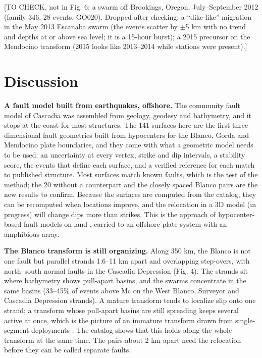 \documentclass[11pt]{article}
\begin{document}
{[}TO CHECK, not in Fig. 6: a swarm off Brookings, Oregon,
July--September 2012 (family 346, 28 events, GO020). Dropped after
checking: a ``dike-like'' migration in the May 2013 Escanaba swarm (the
events scatter by \ensuremath{\pm}5 km with no trend and depths at or above sea level;
it is a 15-hour burst); a 2015 precursor on the Mendocino transform
(2015 looks like 2013--2014 while stations were present).{]}

\section{Discussion}\label{discussion}

\textbf{A fault model built from earthquakes, offshore.} The community
fault model of Cascadia was assembled from geology, geodesy and
bathymetry, and it stops at the coast for most structures. The 141
surfaces here are the first three-dimensional fault geometries built
from hypocenters for the Blanco, Gorda and Mendocino plate boundaries,
and they come with what a geometric model needs to be used: an
uncertainty at every vertex, strike and dip intervals, a stability
score, the events that define each surface, and a verified reference for
each match to published structure. Most surfaces match known faults,
which is the test of the method; the 20 without a counterpart and the
closely spaced Blanco pairs are the new results to confirm. Because the
surfaces are computed from the catalog, they can be recomputed when
locations improve, and the relocation in a 3D model (in progress) will
change dips more than strikes. This is the approach of hypocenter-based
fault models on land \citep{Ouillon2008, Wang2013, Alongi2025}, carried
to an offshore plate system with an amphibious array.

\textbf{The Blanco transform is still organizing.} Along 350 km, the
Blanco is not one fault but parallel strands 1.6--11 km apart and
overlapping step-overs, with north--south normal faults in the Cascadia
Depression (Fig. 4). The strands sit where bathymetry shows pull-apart
basins, and the swarms concentrate in the same basins (33--45\% of
events above Mc on the West Blanco, Surveyor and Cascadia Depression
strands). A mature transform tends to localize slip onto one strand; a
transform whose pull-apart basins are still spreading keeps several
active at once, which is the picture of an immature transform drawn from
single-segment deployments \citep{Ren2023, Lange2026}. The catalog shows
that this holds along the whole transform at the same time. The pairs
about 2 km apart need the relocation before they can be called separate
faults.
\end{document}

